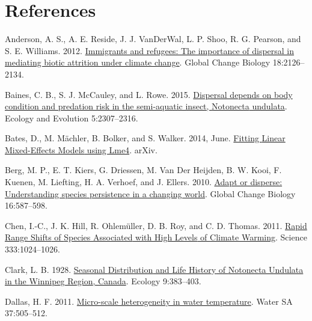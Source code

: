 \documentclass[
]{article}
\newlength{\cslhangindent}
\newenvironment{CSLReferences}[2] %
 {\begin{list}{}{%
  \setlength{\itemindent}{0pt}
  \setlength{\leftmargin}{0pt}
  \setlength{\parsep}{0pt}
  \ifodd #1
   \setlength{\leftmargin}{\cslhangindent}
   \setlength{\itemindent}{-1\cslhangindent}
  \fi
  \setlength{\itemsep}{#2\baselineskip}}}
 {\end{list}}
\begin{document}
\section*{References}\label{references}

\label{refs}
\begin{CSLReferences}{1}{0}
Anderson, A. S., A. E. Reside, J. J. VanDerWal, L. P. Shoo, R. G.
Pearson, and S. E. Williams. 2012.
\href{https://doi.org/10.1111/j.1365-2486.2012.02683.x}{Immigrants and
refugees: The importance of dispersal in mediating biotic attrition
under climate change}. Global Change Biology 18:2126--2134.

Baines, C. B., S. J. McCauley, and L. Rowe. 2015.
\href{https://doi.org/10.1002/ece3.1508}{Dispersal depends on body
condition and predation risk in the semi-aquatic insect, {Notonecta}
undulata}. Ecology and Evolution 5:2307--2316.

Bates, D., M. Mächler, B. Bolker, and S. Walker. 2014, June.
\href{https://arxiv.org/abs/1406.5823}{Fitting {Linear Mixed-Effects
Models} using Lme4}. arXiv.

Berg, M. P., E. T. Kiers, G. Driessen, M. Van Der Heijden, B. W. Kooi,
F. Kuenen, M. Liefting, H. A. Verhoef, and J. Ellers. 2010.
\href{https://doi.org/10.1111/j.1365-2486.2009.02014.x}{Adapt or
disperse: Understanding species persistence in a changing world}. Global
Change Biology 16:587--598.

Chen, I.-C., J. K. Hill, R. Ohlemüller, D. B. Roy, and C. D. Thomas.
2011. \href{https://doi.org/10.1126/science.1206432}{Rapid {Range
Shifts} of {Species Associated} with {High Levels} of {Climate
Warming}}. Science 333:1024--1026.

Clark, L. B. 1928. \href{https://doi.org/10.2307/1929407}{Seasonal
{Distribution} and {Life History} of {Notonecta Undulata} in the
{Winnipeg Region}, {Canada}}. Ecology 9:383--403.

Dallas, H. F. 2011.
\href{https://doi.org/10.10520/EJC116810}{Micro-scale heterogeneity in
water temperature}. Water SA 37:505--512.


\end{CSLReferences}
\end{document}
